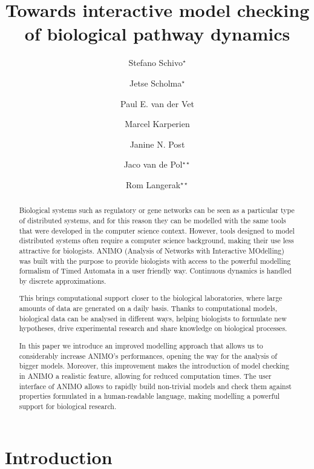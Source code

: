 \documentclass{llncs}
\title{Towards interactive model checking\\of biological pathway dynamics}
\author{Stefano Schivo${}^\star$
\and Jetse Scholma${}^\star$
\and Paul E. van der Vet
\and Marcel Karperien
\and Janine N. Post
\and Jaco van de Pol${}^{\star \star}$
\and Rom Langerak${}^{\star \star}$}
\institute{University of Twente, Enschede, The Netherlands}
\date{}
\begin{document}
\maketitle

\let\oldthefootnote\thefootnote
\renewcommand{\thefootnote}{\fnsymbol{footnote}}
\let\thefootnote\oldthefootnote



\begin{abstract}

Biological systems such as regulatory or gene networks can be
seen as a particular type of distributed systems, and for this reason
they can be modelled with the same tools that were developed in the
computer science context. However, tools designed to model distributed
systems often require a computer science background, making their use
less attractive for biologists. ANIMO (Analysis of Networks with
Interactive MOdelling) was built with the purpose to provide biologists
with access to the powerful modelling formalism of Timed Automata
in a user friendly way. Continuous dynamics is handled by discrete approximations.

This brings computational support closer to the biological laboratories, 
where large amounts of data are generated on a daily basis. Thanks to 
computational models, biological data can be analysed in different ways, 
helping biologists to formulate new hypotheses, drive experimental research 
and share knowledge on biological processes.

In this paper we introduce an improved modelling approach that allows us
to considerably increase ANIMO's performances, opening the way for the
analysis of bigger models. Moreover, this improvement makes the introduction
of model checking in ANIMO a realistic feature, allowing for
reduced computation times. The user interface of ANIMO allows to rapidly
build non-trivial models and check them against properties formulated in
a human-readable language, making modelling a powerful
support for biological research.

\end{abstract}

\section{Introduction}\label{sec:introduction}
\end{document}
